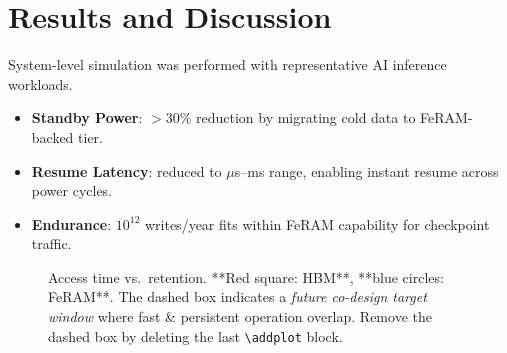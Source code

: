 \section{Results and Discussion}
System-level simulation was performed with representative AI inference workloads.

\begin{itemize}
  \item \textbf{Standby Power}: $>$30\% reduction by migrating cold data to FeRAM-backed tier.
  \item \textbf{Resume Latency}: reduced to $\mu$s–ms range, enabling instant resume across power cycles.
  \item \textbf{Endurance}: $10^{12}$ writes/year fits within FeRAM capability for checkpoint traffic.
\end{itemize}

\begin{figure}[!t]
\centering
{}
\caption{Access time vs.\ retention. **Red square: HBM**, **blue circles: FeRAM**. The dashed box indicates a \emph{future co-design target window} where fast \& persistent operation overlap. Remove the dashed box by deleting the last \texttt{\textbackslash addplot} block.}
\label{fig:retention_access}
\end{figure}
